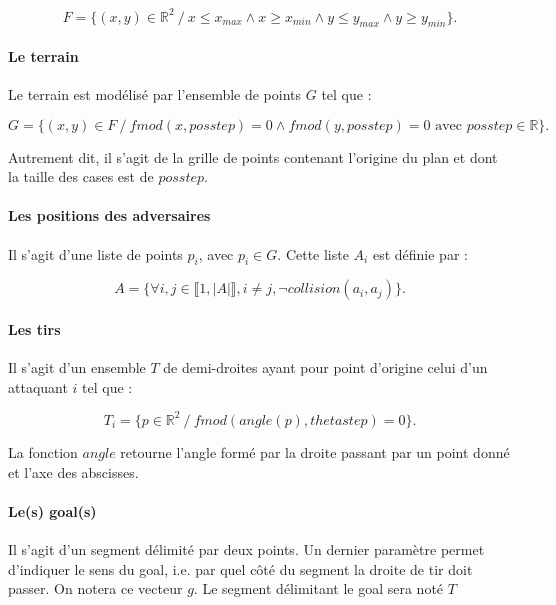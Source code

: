 \documentclass{article}
\begin{document}
\begin{equation*}
F = \{ (x, y) \in \mathbb{R}^2 \ /\  x \leqslant x_{max} \wedge x \geqslant x_{min} \wedge y \leqslant y_{max} \wedge y \geqslant y_{min} \}.
\end{equation*}

\paragraph{Le terrain} Le terrain est modélisé par l'ensemble de points $G$ tel que :

\begin{equation*}
G = \{ (x, y) \in F \ /\  fmod(x, posstep) = 0 \wedge fmod(y, posstep) = 0 \text{ avec } posstep \in \mathbb{R} \}.
\end{equation*}

Autrement dit, il s'agit de la grille de points contenant l'origine du plan et dont la taille des cases est de $posstep$.

\paragraph{Les positions des adversaires} Il s'agit d'une liste de points $p_i$, avec $p_i \in G$. Cette liste $A_i$ est définie par :

\begin{equation}
    A = \{ \forall i, j \in \llbracket 1, |A| \rrbracket, i \ne j, \neg collision(a_i, a_j) \}.
\end{equation}

\paragraph{Les tirs} Il s'agit d'un ensemble $T$ de demi-droites ayant pour point d'origine celui d'un attaquant $i$ tel que :

\begin{equation*}
    T_i = \{ p \in \mathbb{R}^2 \ / \ fmod(angle(p), thetastep) = 0 \}.
\end{equation*}

La fonction $angle$ retourne l'angle formé par la droite passant par un point donné et l'axe des abscisses.

\paragraph{Le(s) goal(s)} Il s'agit d'un segment délimité par deux points. Un dernier paramètre permet d'indiquer le sens du goal, i.e. par quel \og côté \fg{} du segment la droite de tir doit passer. On notera ce vecteur $g$. Le segment délimitant le goal sera noté $T$
\end{document}
